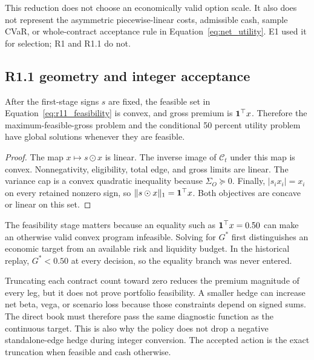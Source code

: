 This reduction does not choose an economically valid option scale. It also does not
represent the asymmetric piecewise-linear costs, admissible cash, sample CVaR, or
whole-contract acceptance rule in Equation~\eqref{eq:net_utility}. E1 used it for
selection; R1 and R1.1 do not.

\subsection{R1.1 geometry and integer acceptance}

\begin{proposition}
After the first-stage signs \(s\) are fixed, the feasible set in
Equation~\eqref{eq:r11_feasibility} is convex, and gross premium is \(\mathbf{1}^\top x\).
Therefore the maximum-feasible-gross problem and the conditional 50 percent utility
problem have global solutions whenever they are feasible.
\end{proposition}
\begin{proof}
The map \(x\mapsto s\odot x\) is linear. The inverse image of \(\mathcal C_t\) under this
map is convex. Nonnegativity, eligibility, total edge, and gross limits are linear. The
variance cap is a convex quadratic inequality because \(\Sigma_O\succeq0\). Finally,
\(|s_i x_i|=x_i\) on every retained nonzero sign, so
\(\|s\odot x\|_1=\mathbf{1}^\top x\). Both objectives are concave or linear on this set.
\end{proof}

The feasibility stage matters because an equality such as \(\mathbf{1}^\top x=0.50\) can make
an otherwise valid convex program infeasible. Solving for \(G^*\) first distinguishes an
economic target from an available risk and liquidity budget. In the historical replay,
\(G^*<0.50\) at every decision, so the equality branch was never entered.

Truncating each contract count toward zero reduces the premium magnitude of every leg,
but it does not prove portfolio feasibility. A smaller hedge can increase net beta, vega,
or scenario loss because those constraints depend on signed sums. The direct book must
therefore pass the same diagnostic function as the continuous target. This is also why
the policy does not drop a negative standalone-edge hedge during integer conversion. The
accepted action is the exact truncation when feasible and cash otherwise.

